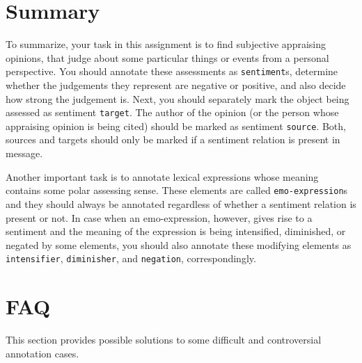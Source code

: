 \documentclass[11pt,a4paper]{article}
\begin{document}
\section{Summary}\label{sec:summary}
To summarize, your task in this assignment is to find subjective appraising
opinions, that judge about some particular things or events from a personal
perspective.  You should annotate these assessments as \texttt{sentiment}s,
determine whether the judgements they represent are negative or positive, and
also decide how strong the judgement is.  Next, you should separately mark the
object being assessed as sentiment \texttt{target}.  The author of the opinion
(or the person whose appraising opinion is being cited) should be marked as
sentiment \texttt{source}.  Both, sources and targets should only be marked if
a sentiment relation is present in message.

Another important task is to annotate lexical expressions whose meaning
contains some polar assessing sense.  These elements are called
\texttt{emo-expression}s and they should always be annotated regardless of
whether a sentiment relation is present or not.  In case when an
emo-expression, however, gives rise to a sentiment and the meaning of the
expression is being intensified, diminished, or negated by some elements, you
should also annotate these modifying elements as \texttt{intensifier},
\texttt{diminisher}, and \texttt{negation}, correspondingly.

\section{FAQ}\label{sec:faq}
This section provides possible solutions to some difficult and controversial
annotation cases.
\end{document}
